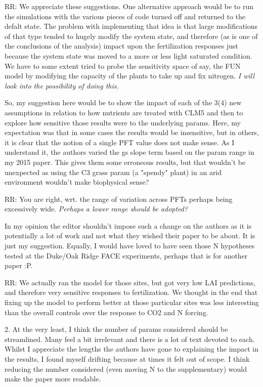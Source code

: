 \documentclass{article}
\begin{document}
RR: We appreciate these suggestions. One alternative approach would be to run the simulations with the various pieces of code turned off and returned to the defalt state. The problem with implementing that idea is that large modifications of that type tended to hugely modify the system state, and therefore (as is one of the conclusions of the analysis) impact upon the fertilization responses just because the system state was moved to a more or less light saturated condition. We have to some extent tried to probe the sensitivity space of say, the FUN model by modifying the capacity of the plants to take up and fix nitrogen. \textit{I will look into the possibility of doing this.}

So, my suggestion here would be to show the impact of each of the 3(4) new assumptions in relation to how nutrients are treated with CLM5 and then to explore how sensitive those results were to the underlying params. Here, my expectation was that in some cases the results would be insensitive, but in others, it is clear that the notion of a single PFT value does not make sense. As I understand it, the authors varied the gs slope term based on the param range in my 2015 paper. This gives them some erroneous results, but that wouldn't be unexpected as using the C3 grass param (a "spendy" plant) in an arid environment wouldn't make biophysical sense? 

RR: You are right, wrt. the range of variation across PFTs perhaps being excessively wide. \emph{Perhaps a lower range should be adopted?}

In my opinion the editor shouldn't impose such a change on the authors as it is potentially a lot of work and not what they wished their paper to be about. It is just my suggestion. Equally, I would have loved to have seen those N hypotheses tested at the Duke/Oak Ridge FACE experiments, perhaps that is for another paper :P. 

RR: We actually ran the model for those sites, but got very low LAI predictions, and therefore very sensitive responses to fertilization. We thought in the end that fixing up the model to perform better at those particular sites was less interesting than the overall controls over the response to CO2 and N forcing. 

2. At the very least, I think the number of params considered should be streamlined. Many feel a bit irrelevant and there is a lot of text devoted to each. Whilst I appreciate the lengths the authors have gone to explaining the impact in the results, I found myself drifting because at times it felt out of scope. I think reducing the number considered (even moving N to the supplementary) would make the paper more readable. 
\end{document}
